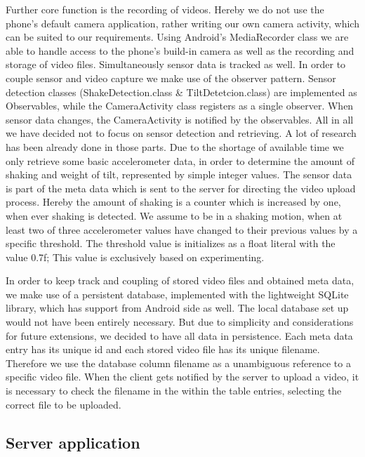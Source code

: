 \documentclass[conference]{IEEEtran}
\begin{document}
Further core function is the recording of videos. Hereby we do not use the phone's default camera application,
rather writing our own camera activity, which can be suited to our requirements.
Using Android's MediaRecorder class we are able to handle access to the phone's build-in camera
as well as the recording and storage of video files.
Simultaneously sensor data is tracked as well.
In order to couple sensor and video capture we make use of the observer pattern.
Sensor detection classes (ShakeDetection.class \& TiltDetetcion.class) are implemented as Observables,
while the CameraActivity class registers as a single observer. When sensor data changes, the CameraActivity is notified by the observables.
All in all we have decided not to focus on sensor detection and retrieving.
A lot of research has been already done in those parts. Due to the shortage of available time we only retrieve some basic accelerometer data,
in order to determine the amount of shaking and weight of tilt, represented by simple integer values.
The sensor data is part of the meta data which is sent to the server for directing the video upload process.
Hereby the amount of shaking is a counter which is increased by one, when ever shaking is detected.
We assume to be in a shaking motion, when at least two of three accelerometer values have changed to their previous values by a specific threshold.
The threshold value is initializes as a float literal with the value 0.7f; This value is exclusively based on experimenting.


In order to keep track and coupling of stored video files and obtained meta data, we make use of a persistent database,
implemented with the lightweight SQLite library, which has support from Android side as well.
The local database set up would not have been entirely necessary. But due to simplicity and considerations for future extensions, we decided to have all data in persistence.
Each meta data entry has its unique id and each stored video file has its unique filename.
Therefore we use the database column filename as a unambiguous reference to a specific video file. When the client gets notified by the server to upload a video, it is necessary to check the filename in the within the table entries, selecting the correct file to be uploaded.



\subsection{Server application}
\end{document}
